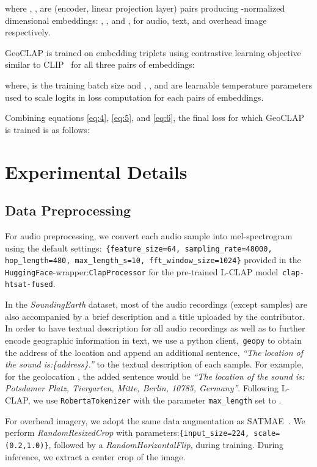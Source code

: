 \documentclass{bmvc2k}
\begin{document}
 where , ,   are (encoder, linear projection layer) pairs producing -normalized  dimensional embeddings: , , and , for audio, text, and overhead image respectively. 

GeoCLAP is trained on embedding triplets using contrastive learning objective similar to CLIP~\cite{radford2021learning} for all three pairs of embeddings:





 where,  is the training batch size and , , and  are learnable temperature parameters used to scale logits in loss computation for each pairs of embeddings.

Combining equations \ref{eq:4}, \ref{eq:5}, and \ref{eq:6}, the final loss for which GeoCLAP is trained is as follows:


\newcommand{\cmark}{\ding{51}}\newcommand{\xmark}{\ding{55}}

\section{Experimental Details}
\subsection{Data Preprocessing}
For audio preprocessing, we convert each audio sample into mel-spectrogram using the default settings:~\texttt{\{feature\_size=64, sampling\_rate=48000, hop\_length=480, max\_length\_s=10, fft\_window\_size=1024\}} provided in the \texttt{HuggingFace}-wrapper:\texttt{ClapProcessor} for the pre-trained L-CLAP model~\texttt{clap-htsat-fused}.

In the {\em SoundingEarth} dataset, most of the audio recordings (except  samples) are also accompanied by a brief description and a title uploaded by the contributor. In order to have textual description for all audio recordings as well as to further encode geographic information in text, we use a python client,~\texttt{geopy} to obtain the address of the location and append an additional sentence, \emph{``The location of the sound is:\{address\}.''} to the textual description of each sample. For example, for the geolocation , the added sentence would be \emph{``The location of the sound is: Potsdamer Platz, Tiergarten, Mitte, Berlin, 10785, Germany''}. Following L-CLAP, we use \texttt{RobertaTokenizer} with the parameter \texttt{max\_length} set to . 

For overhead imagery, we adopt the same data augmentation as SATMAE~\cite{cong2022satmae}. We perform \textit{RandomResizedCrop} with parameters:\texttt{\{input\_size=224, scale=(0.2,1.0)\}}, followed by a \textit{RandomHorizontalFlip}, during training. During inference, we extract a  center crop of the image.
\end{document}

